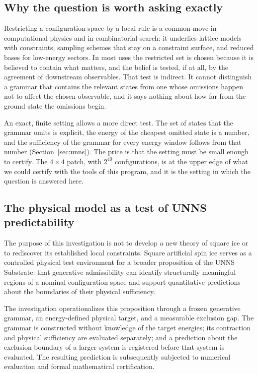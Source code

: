 \documentclass[11pt,a4paper]{article}
\theoremstyle{plain}
\theoremstyle{definition}
\theoremstyle{remark}
\begin{document}
\subsection{Why the question is worth asking exactly}
Restricting a configuration space by a local rule is a common move in computational physics and in combinatorial search: it underlies lattice models with constraints, sampling schemes that stay on a constraint surface, and reduced bases for low-energy sectors. In most uses the restricted set is chosen because it is believed to contain what matters, and the belief is tested, if at all, by the agreement of downstream observables. That test is indirect. It cannot distinguish a grammar that contains the relevant states from one whose omissions happen not to affect the chosen observable, and it says nothing about how far from the ground state the omissions begin.

An exact, finite setting allows a more direct test. The set of states that the grammar omits is explicit, the energy of the cheapest omitted state is a number, and the sufficiency of the grammar for every energy window follows from that number (Section~\ref{sec:unns}). The price is that the setting must be small enough to certify. The $4\times4$ patch, with $2^{40}$ configurations, is at the upper edge of what we could certify with the tools of this program, and it is the setting in which the question is answered here.

\subsection{The physical model as a test of UNNS predictability}
The purpose of this investigation is not to develop a new theory of square ice or to rediscover its established local constraints. Square artificial spin ice serves as a controlled physical test environment for a broader proposition of the UNNS Substrate: that generative admissibility can identify structurally meaningful regions of a nominal configuration space and support quantitative predictions about the boundaries of their physical sufficiency.

The investigation operationalizes this proposition through a frozen generative grammar, an energy-defined physical target, and a measurable exclusion gap. The grammar is constructed without knowledge of the target energies; its contraction and physical sufficiency are evaluated separately; and a prediction about the exclusion boundary of a larger system is registered before that system is evaluated. The resulting prediction is subsequently subjected to numerical evaluation and formal mathematical certification.
\end{document}
